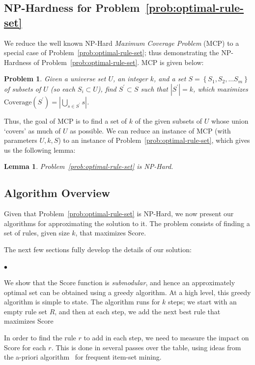 \documentclass[10pt,journal,compsoc]{IEEEtran}
\newtheorem{lemma}{Lemma}
\newcounter{prob}
\newtheorem{problem}[prob]{Problem}
\newcommand{\squishlist}{
   \begin{list}{$\bullet$}
    { \setlength{\itemsep}{0pt}
      \setlength{\parsep}{2pt}
      \setlength{\topsep}{2pt}
      \setlength{\partopsep}{0pt}
    }
}
\newcommand{\squishend}{\end{list}}
\begin{document}
\subsection{NP-Hardness for Problem~\ref{prob:optimal-rule-set}}
We reduce the well known {\sc NP-Hard} {\em Maximum Coverage Problem} (MCP) to a special case of Problem~\ref{prob:optimal-rule-set};
thus demonstrating the {\sc NP-Hard}ness of Problem~\ref{prob:optimal-rule-set}. MCP is given below: 
\begin{problem}\label{prob:maximum-coverage}
Given a universe set $U$, an integer $k$, and a set $S = \left\lbrace S_1, S_2, ... S_m \right\rbrace$ of subsets of $U$ (so each $S_i \subset U$), find $S^{\prime} \subset S$ such that $|S^{\prime}| = k$, which maximizes $\text{Coverage}(S^{\prime}) = |\bigcup_{s \in S^{\prime}} s|$.
\end{problem}
Thus, the goal of MCP is to find a set of $k$ of the given subsets of $U$ whose union `covers' as much of $U$ as possible. We can reduce an instance of MCP (with parameters $U, k, S$) to an instance of Problem~\ref{prob:optimal-rule-set}, which gives us the following lemma:
\begin{lemma}
Problem~\ref{prob:optimal-rule-set} is {\sc NP-Hard}.
\end{lemma}


\subsection{Algorithm Overview}\label{sec:alg-overview}
Given that Problem~\ref{prob:optimal-rule-set} is {\sc NP-Hard}, we now present our algorithms 
for approximating the solution to it. 
The problem consists of finding a set of rules, given size $k$, that maximizes 
Score. 


The next few sections fully develop the
details of our solution:

\squishlist
\item We show that the Score function is {\em submodular}, and hence an approximately optimal set can be obtained using a greedy algorithm. At a high level, this greedy algorithm is simple to state. The algorithm runs for $k$ steps;
we start with an empty rule set $R$, and then at each step, we add the next best rule that maximizes Score
 
\item In order to find the rule $r$ to add in each step, we need to measure the impact on Score for each $r$. This is done in several passes over the table, using ideas from the a-priori algorithm~\cite{apriori} for frequent item-set mining. 
\squishend
\end{document}
